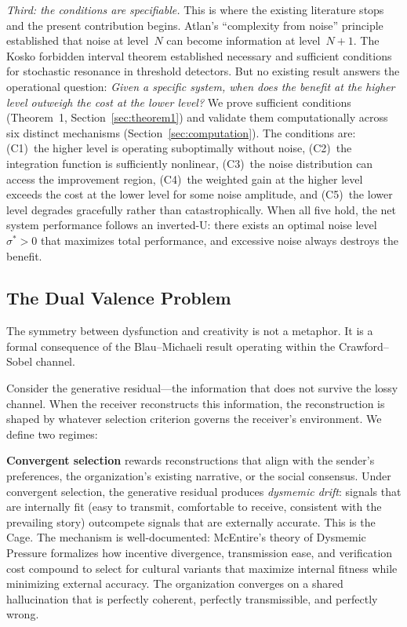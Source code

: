\documentclass[12pt,letterpaper]{article}
\theoremstyle{definition}
\theoremstyle{remark}
\begin{document}
\emph{Third: the conditions are specifiable.} This is where the existing literature stops and the present contribution begins. Atlan's ``complexity from noise'' principle \citep{atlan1979} established that noise at level~$N$ can become information at level~$N{+}1$. The Kosko forbidden interval theorem established necessary and sufficient conditions for stochastic resonance in threshold detectors. But no existing result answers the operational question: \emph{Given a specific system, when does the benefit at the higher level outweigh the cost at the lower level?} We prove sufficient conditions (Theorem~1, Section~\ref{sec:theorem1}) and validate them computationally across six distinct mechanisms (Section~\ref{sec:computation}). The conditions are: (C1)~the higher level is operating suboptimally without noise, (C2)~the integration function is sufficiently nonlinear, (C3)~the noise distribution can access the improvement region, (C4)~the weighted gain at the higher level exceeds the cost at the lower level for some noise amplitude, and (C5)~the lower level degrades gracefully rather than catastrophically. When all five hold, the net system performance follows an inverted-U: there exists an optimal noise level~$\sigma^* > 0$ that maximizes total performance, and excessive noise always destroys the benefit.


\subsection{The Dual Valence Problem}

The symmetry between dysfunction and creativity is not a metaphor. It is a formal consequence of the Blau--Michaeli result operating within the Crawford--Sobel channel.

Consider the generative residual---the information that does not survive the lossy channel. When the receiver reconstructs this information, the reconstruction is shaped by whatever selection criterion governs the receiver's environment. We define two regimes:

\textbf{Convergent selection} rewards reconstructions that align with the sender's preferences, the organization's existing narrative, or the social consensus. Under convergent selection, the generative residual produces \emph{dysmemic drift}: signals that are internally fit (easy to transmit, comfortable to receive, consistent with the prevailing story) outcompete signals that are externally accurate. This is the Cage. The mechanism is well-documented: McEntire's theory of Dysmemic Pressure formalizes how incentive divergence, transmission ease, and verification cost compound to select for cultural variants that maximize internal fitness while minimizing external accuracy. The organization converges on a shared hallucination that is perfectly coherent, perfectly transmissible, and perfectly wrong.
\end{document}
